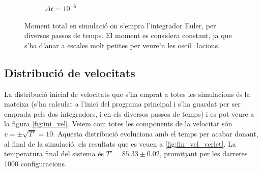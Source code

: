 \documentclass[a4paper,10pt]{article}
\begin{document}
\begin{figure}[h]
\begin{subfigure}{0.3\linewidth}
		\caption{$\Delta t = 10^{-5}$}
		\label{fig:momentumeuler3}
	\end{subfigure}
	\caption{Moment total en simulació on s'empra l'integrador Euler, per diversos passos de temps. El moment es considera constant, ja que s'ha d'anar a escales molt petites per veure'n les oscil·lacions.}
	\label{fig:momentumeuler}
\end{figure}

\subsection{Distribució de velocitats}

La distribució inicial de velocitats que s'ha emprat a totes les simulacions és la mateixa (s'ha calculat a l'inici del programa principal i s'ha guardat per ser emprada pels dos integradors, i en els diversos passos de temps) i es pot veure a la figura \ref{fig:ini_vel}. Veiem com totes les components de la velocitat són $v = \pm \sqrt{T'} = 10$. Aquesta distribució evoluciona amb el temps per acabar donant, al final de la simulació, els resultats que es veuen a \ref{fig:fin_vel_verlet}. La temperatura final del sistema és $T' = 85.33 \pm 0.02 $, promitjant per les darreres 1000 configuracions. 
\end{document}
